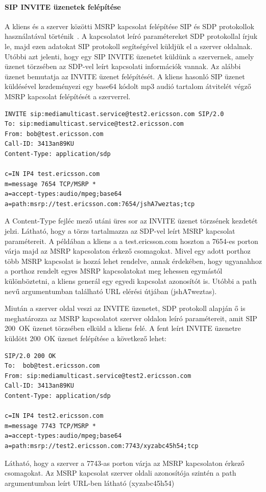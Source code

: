 \paragraph{SIP INVITE üzenetek felépítése\\}
\label{sec:sip_invite}

A kliens és a szerver közötti MSRP kapcsolat felépítése SIP és SDP protokollok használatával történik~\cite{rfc4975}. A kapcsolatot leíró paramétereket SDP protokollal írjuk le, majd ezen adatokat SIP protokoll segítségével küldjük el a szerver oldalnak. Utóbbi azt jelenti, hogy egy SIP INVITE üzenetet küldünk a szervernek, amely üzenet törzsében az SDP-vel leírt kapcsolati információk vannak. Az alábbi üzenet bemutatja az INVITE üzenet felépítését. A kliens hasonló SIP üzenet küldésével kezdeményezi egy base64 kódolt mp3 audió tartalom átvitelét végző MSRP kapcsolat felépítését a szerverrel.
\medskip
\fontsize{10}{10}
\begin{verbatim}
INVITE sip:mediamulticast.service@test2.ericsson.com SIP/2.0
To: sip:mediamulticast.service@test2.ericsson.com
From: bob@test.ericsson.com
Call-ID: 3413an89KU
Content-Type: application/sdp

c=IN IP4 test.ericsson.com
m=message 7654 TCP/MSRP *
a=accept-types:audio/mpeg;base64
a=path:msrp://test.ericsson.com:7654/jshA7weztas;tcp
\end{verbatim}
\fontsize{12}{12} 
\medskip
A Content-Type fejléc mező utáni üres sor az INVITE üzenet törzsének kezdetét jelzi. Látható, hogy a  törzs tartalmazza az SDP-vel leírt MSRP kapcsolat paramétereit. A példában a kliens a a test.ericsson.com hoszton a 7654-es porton várja majd az MSRP kapcsolaton érkező csomagokat. Mivel egy adott porthoz több MSRP kapcsolat is hozzá lehet rendelve, annak érdekében, hogy ugyanahhoz a porthoz rendelt egyes MSRP kapcsolatokat meg lehessen egymástól különböztetni, a kliens generál egy egyedi kapcsolat azonosítót is. Utóbbi a path nevű argumentumban található URL elérési útjában (jshA7weztas). 

Miután a szerver oldal veszi az INVITE üzenetet, SDP protokoll alapján ő is meghatározza az MSRP kapcsolatot szerver oldalon leíró paramétereit, amit SIP 200~OK üzenet törzsében elküld a kliens felé. A fent leírt INVITE üzenetre küldött 200~OK üzenet felépítése a következő lehet:
\medskip
\fontsize{10}{10}
\begin{verbatim}
SIP/2.0 200 OK
To:  bob@test.ericsson.com
From: sip:mediamulticast.service@test2.ericsson.com
Call-ID: 3413an89KU
Content-Type: application/sdp

c=IN IP4 test2.ericsson.com
m=message 7743 TCP/MSRP *
a=accept-types:audio/mpeg;base64
a=path:msrp://test2.ericsson.com:7743/xyzabc45h54;tcp
\end{verbatim}
\fontsize{12}{12} 
\medskip
Látható, hogy a szerver a 7743-as porton várja az MSRP kapcsolaton érkező csomagokat. Az MSRP kapcsolat szerver oldali azonosítója szintén a path argumentumban leírt URL-ben látható (xyzabc45h54)

